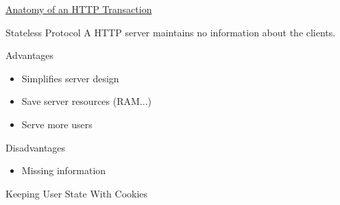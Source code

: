 \href{http://blog.catchpoint.com/2010/09/17/anatomyhttp/}{Anatomy of an HTTP Transaction}

\begin{frame}{Stateless Protocol}
  A HTTP server maintains no information about the clients.
  \begin{block}{Advantages}
    \begin{itemize}
    \item Simplifies server design
    \item Save server resources (RAM...)
    \item Serve more users
    \end{itemize}
  \end{block}
  \begin{block}{Disadvantages}
    \begin{itemize}
    \item Missing information
    \end{itemize}
  \end{block}
\end{frame}

\begin{frame}{Keeping User State With Cookies}
  \begin{center}
     
  \end{center}
\end{frame}

